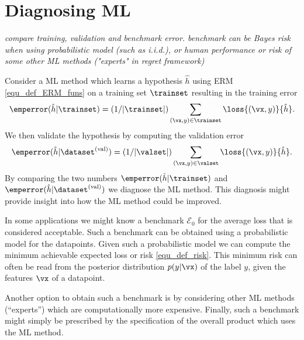\documentclass[12pt]{report}
\begin{document}
\section{Diagnosing ML} 
\label{equ_diagnosis_ML}
\emph{compare training, validation and benchmark error. benchmark can 
be Bayes risk when using probabilistic model (such as i.i.d.), or human 
performance or risk of some other ML methods ("experts" in regret framework)  }

Consider a ML method which learns a hypothesis $\hat{h}$ using ERM 
\eqref{equ_def_ERM_funs} on a training set $\trainset$ resulting in the 
training error 
$$\emperror(\hat{h}| \trainset) =  (1/|\trainset|) \sum_{(\vx,y) \in \trainset} \loss{(\vx,y)}{\hat{h}}.$$ 
We then validate the hypothesis by computing the validation error  
$$\emperror(\hat{h}| \dataset^{(\rm val)}) = (1/|\valset|) \sum_{(\vx,y) \in \valset} \loss{(\vx,y)}{\hat{h}}.$$ 
By comparing the two numbers $\emperror(\hat{h}| \trainset)$ and $\emperror(\hat{h}| \dataset^{(\rm val)})$ 
we diagnose the ML method. This diagnosis might provide insight into how 
the ML method could be improved. 

In some applications we might know a benchmark $\mathcal{E}_{0}$ 
for the average loss that is considered acceptable. Such a benchmark 
can be obtained using a probabilistic model for the datapoints. Given such a probabilistic 
model we can compute the minimum achievable expected loss or risk \eqref{equ_def_risk}. 
This minimum risk can often be read from the posterior distribution $p(y|\vx)$ of 
the label $y$, given the features $\vx$ of a datapoint. 

Another option to obtain such a benchmark is by considering other ML methods 
(``experts'') which are computationally more expensive. Finally, such a benchmark 
might simply be prescribed by the specification of the overall product which uses 
the ML method. 
\end{document}
